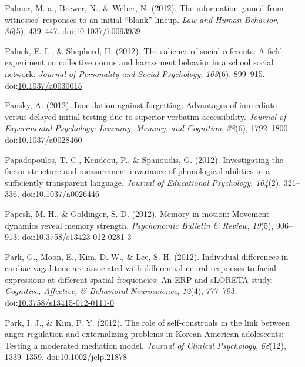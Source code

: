 \documentclass[english,man]{apa6}
\theoremstyle{definition}
\theoremstyle{definition}
\theoremstyle{definition}
\theoremstyle{remark}
\begin{document}
\hypertarget{ref-Palmer2012}{}
Palmer, M. a., Brewer, N., \& Weber, N. (2012). The information gained
from witnesses' responses to an initial ``blank'' lineup. \emph{Law and
Human Behavior}, \emph{36}(5), 439--447.
doi:\href{https://doi.org/10.1037/h0093939}{10.1037/h0093939}

\hypertarget{ref-Paluck2012}{}
Paluck, E. L., \& Shepherd, H. (2012). The salience of social referents:
A field experiment on collective norms and harassment behavior in a
school social network. \emph{Journal of Personality and Social
Psychology}, \emph{103}(6), 899--915.
doi:\href{https://doi.org/10.1037/a0030015}{10.1037/a0030015}

\hypertarget{ref-Pansky2012}{}
Pansky, A. (2012). Inoculation against forgetting: Advantages of
immediate versus delayed initial testing due to superior verbatim
accessibility. \emph{Journal of Experimental Psychology: Learning,
Memory, and Cognition}, \emph{38}(6), 1792--1800.
doi:\href{https://doi.org/10.1037/a0028460}{10.1037/a0028460}

\hypertarget{ref-Papadopoulos2012}{}
Papadopoulos, T. C., Kendeou, P., \& Spanoudis, G. (2012). Investigating
the factor structure and measurement invariance of phonological
abilities in a sufficiently transparent language. \emph{Journal of
Educational Psychology}, \emph{104}(2), 321--336.
doi:\href{https://doi.org/10.1037/a0026446}{10.1037/a0026446}

\hypertarget{ref-Papesh2012}{}
Papesh, M. H., \& Goldinger, S. D. (2012). Memory in motion: Movement
dynamics reveal memory strength. \emph{Psychonomic Bulletin \& Review},
\emph{19}(5), 906--913.
doi:\href{https://doi.org/10.3758/s13423-012-0281-3}{10.3758/s13423-012-0281-3}

\hypertarget{ref-Park2012}{}
Park, G., Moon, E., Kim, D.-W., \& Lee, S.-H. (2012). Individual
differences in cardiac vagal tone are associated with differential
neural responses to facial expressions at different spatial frequencies:
An ERP and sLORETA study. \emph{Cognitive, Affective, \& Behavioral
Neuroscience}, \emph{12}(4), 777--793.
doi:\href{https://doi.org/10.3758/s13415-012-0111-0}{10.3758/s13415-012-0111-0}

\hypertarget{ref-Park2012a}{}
Park, I. J., \& Kim, P. Y. (2012). The role of self-construals in the
link between anger regulation and externalizing problems in Korean
American adolescents: Testing a moderated mediation model. \emph{Journal
of Clinical Psychology}, \emph{68}(12), 1339--1359.
doi:\href{https://doi.org/10.1002/jclp.21878}{10.1002/jclp.21878}
\end{document}
